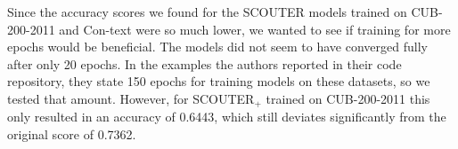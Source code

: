 Since the accuracy scores we found for the SCOUTER models trained on CUB-200-2011 and Con-text were so much lower, we wanted to see if training for more epochs would be beneficial. The models did not seem to have converged fully after only 20 epochs. In the examples the authors reported in their code repository, they state 150 epochs for training models on these datasets, so we tested that amount. However, for SCOUTER$_+$ trained on CUB-200-2011 this only resulted in an accuracy of 0.6443, which still deviates significantly from the original score of 0.7362.

